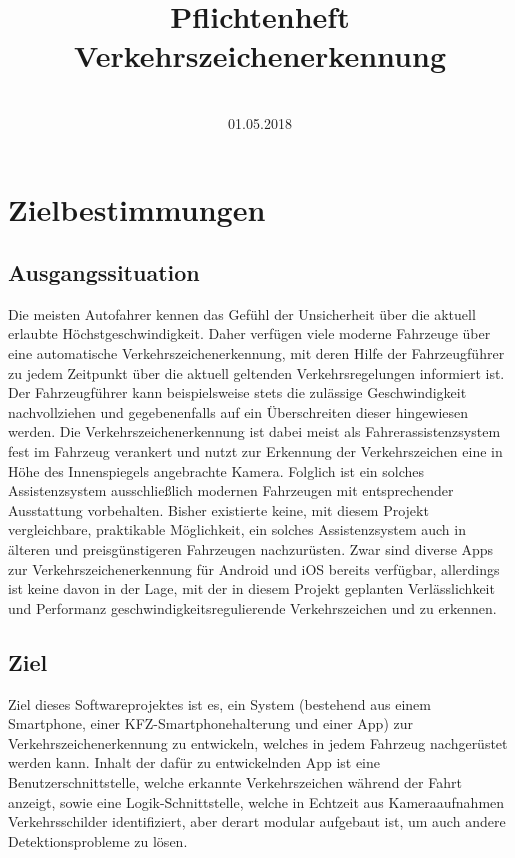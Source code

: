 \documentclass[12pt,a4paper,ngerman,enabledeprecatedfontcommands]{scrreprt}
\title{Pflichtenheft\\ Verkehrszeichenerkennung}
\date{~\\01.05.2018}
\begin{document}
\maketitle%
\tableofcontents%
\pagestyle{plain}%

\chapter{Zielbestimmungen}
\label{chap:zielbestimmmungen}

\section{Ausgangssituation}
Die meisten Autofahrer kennen das Gefühl der Unsicherheit über die aktuell erlaubte Höchstgeschwindigkeit. Daher verfügen viele moderne Fahrzeuge über eine automatische Verkehrszeichenerkennung, mit deren Hilfe der Fahrzeugführer zu jedem Zeitpunkt über die aktuell geltenden Verkehrsregelungen informiert ist. Der Fahrzeugführer kann beispielsweise stets die zulässige Geschwindigkeit nachvollziehen und gegebenenfalls auf ein Überschreiten dieser hingewiesen werden. Die Verkehrszeichenerkennung ist dabei meist als Fahrerassistenzsystem fest im \gls{Fahrzeug} verankert und nutzt zur Erkennung der Verkehrszeichen eine in Höhe des Innenspiegels angebrachte Kamera. Folglich ist ein solches Assistenzsystem ausschließlich modernen Fahrzeugen mit entsprechender Ausstattung vorbehalten.
Bisher existierte keine, mit diesem Projekt vergleichbare, praktikable Möglichkeit, ein solches Assistenzsystem auch in älteren und preisgünstigeren Fahrzeugen nachzurüsten. Zwar sind diverse Apps zur Verkehrszeichenerkennung für Android und iOS bereits verfügbar, allerdings ist keine davon in der Lage, mit der in diesem Projekt geplanten Verlässlichkeit und Performanz geschwindigkeitsregulierende Verkehrszeichen und  zu erkennen.\\

\section{Ziel}
Ziel dieses Softwareprojektes ist es, ein \gls{System} (bestehend aus einem \gls{Smartphone}, einer KFZ-Smartphonehalterung und einer \gls{App}) zur Verkehrszeichenerkennung zu entwickeln,
welches in jedem \gls{Fahrzeug} nachgerüstet werden kann. Inhalt der dafür zu entwickelnden \gls{App} ist eine Benutzerschnittstelle, welche erkannte Verkehrszeichen während der Fahrt anzeigt, sowie eine Logik-Schnittstelle, welche in Echtzeit aus Kameraaufnahmen Verkehrsschilder identifiziert, aber derart modular aufgebaut ist, um auch andere Detektionsprobleme zu lösen.\\
\end{document}
